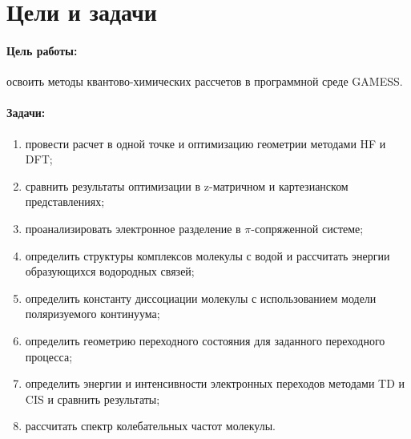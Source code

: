 \section{Цели и задачи}
\paragraph{Цель работы:} освоить методы квантово-химических рассчетов в программной среде GAMESS.

\paragraph{Задачи:}
\begin{enumerate}
    \item провести расчет в одной точке и оптимизацию геометрии методами HF и DFT;
    \item сравнить результаты оптимизации в z-матричном и картезианском представлениях;
    \item проанализировать электронное разделение в $\pi$-сопряженной системе;
    \item определить структуры комплексов молекулы с водой и рассчитать энергии образующихся водородных связей;
    \item определить константу диссоциации молекулы с использованием модели поляризуемого континуума;
    \item определить геометрию переходного состояния для заданного переходного процесса;
    \item определить энергии и интенсивности электронных переходов методами TD и CIS и сравнить результаты;
    \item рассчитать спектр колебательных частот молекулы.
\end{enumerate}
